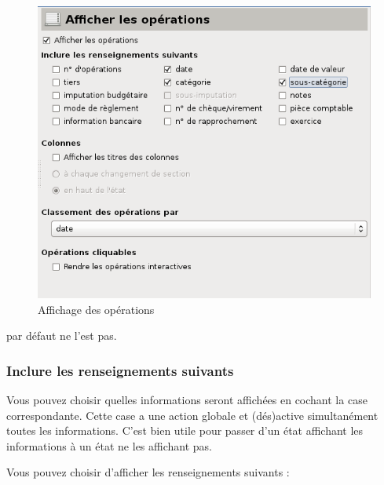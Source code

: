 \begin{figure}[htbp]
\begin{center}
\includegraphics[scale=0.5]{image/screenshot/reportcreation_display_transactions}
\end{center}
\caption{Affichage des opérations}
\label{reportcreation-display-transactions-img}
\end{figure}
\else par défaut ne l'est pas.
\fi
 

\subsubsection{Inclure les renseignements suivants}

Vous pouvez choisir quelles informations seront affichées en cochant la case correspondante. Cette case a une action globale et (dés)active simultanément toutes les informations. C'est bien utile pour passer d'un état affichant les informations à un état ne les affichant pas.

Vous pouvez choisir d'afficher les renseignements suivants :

\menu{}

